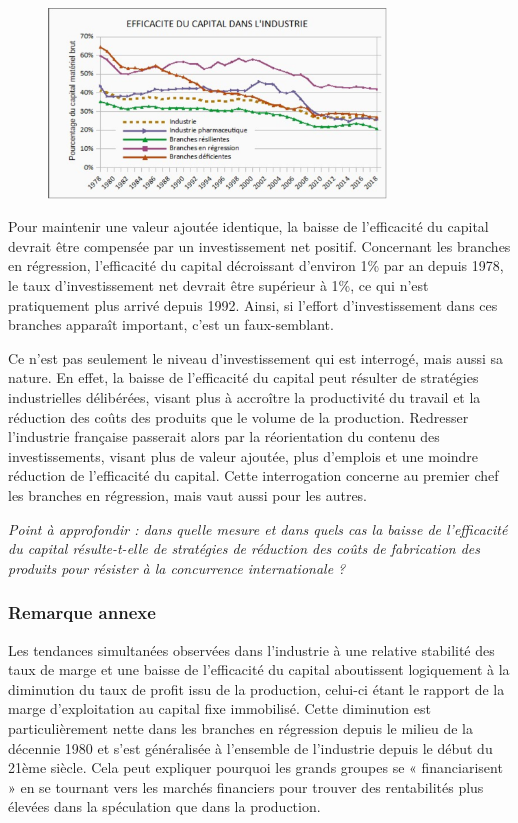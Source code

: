 \documentclass[a4paper]{article}
\begin{document}
\begin{figure}[H]
    \centering
    \includegraphics*[width=0.8\textwidth]{images/efficacite-capital}
    \label{fig:efficacite-capital}
\end{figure}

Pour maintenir une valeur ajoutée identique, la baisse de l’efficacité du capital devrait être compensée par un investissement net positif. Concernant les branches en régression, l’efficacité du capital décroissant d’environ 1\% par an depuis 1978, le taux d’investissement net devrait être supérieur à 1\%, ce qui n’est pratiquement plus arrivé depuis 1992. Ainsi, si l’effort d’investissement dans ces branches apparaît important, c’est un faux-semblant. 

Ce n’est pas seulement le niveau d’investissement qui est interrogé, mais aussi sa nature. En effet,  la baisse de l’efficacité du capital peut résulter de stratégies industrielles délibérées, visant plus à accroître la productivité du travail et la réduction des coûts des produits que le volume de la production. Redresser l’industrie française passerait alors par la réorientation du contenu des investissements, visant plus de valeur ajoutée, plus d’emplois et une moindre réduction de l’efficacité du capital. Cette interrogation concerne au premier chef les branches en régression, mais vaut aussi pour les autres.  

\textit{Point à approfondir : dans quelle mesure et dans quels cas la baisse de l’efficacité du capital résulte-t-elle de stratégies de réduction des coûts de fabrication des produits pour résister à la concurrence internationale ?}

\subsubsection{Remarque annexe}
Les tendances simultanées observées dans l’industrie à une relative stabilité des taux de marge et une baisse de l’efficacité du capital aboutissent logiquement à la diminution du taux de profit issu de la production, celui-ci étant le rapport de la marge d’exploitation au capital fixe immobilisé. Cette diminution est particulièrement nette dans les branches en régression depuis le milieu de la décennie 1980 et s’est généralisée à l’ensemble de l’industrie depuis le début du 21ème siècle. Cela peut expliquer pourquoi les grands groupes se « financiarisent » en se tournant vers les marchés financiers pour trouver des rentabilités plus élevées dans la spéculation que dans la production. 
\end{document}
